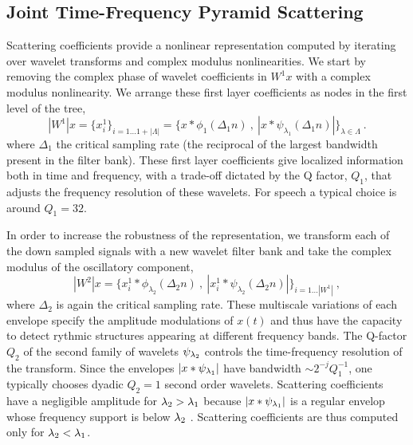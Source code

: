 \subsection{Joint Time-Frequency Pyramid Scattering}

Scattering coefficients provide a nonlinear representation 
computed by iterating over wavelet transforms and complex modulus nonlinearities. 
%
We start by removing the complex phase of wavelet coefficients in $W^1x$ with a 
complex modulus nonlinearity. We arrange these first layer coefficients as nodes in the first level of the tree,
\[
|W^1| x = \{ x^1_i \}_{i=1\dots 1+|\Lambda|}= \{x \ast \phi_1(\Delta_1 n)~,~|x \ast \psi_{\lambda_1}(\Delta_1 n)|  \}_{\lambda \in \Lambda}~.
\]
where $\Delta_1$ the critical sampling rate (the reciprocal of the largest bandwidth present
in the filter bank).
These first layer coefficients give localized information both in
time and frequency, with a trade-off dictated by the Q factor, $Q_1$, that adjusts the frequency resolution of 
these wavelets.  For speech a typical choice is around $Q_1=32$.

In order to increase the robustness of the representation, we transform each of the down sampled signals 
with a new wavelet filter bank and take the complex modulus of the oscillatory component, 
$$|W^2| x = \{ x^1_i \ast \phi_{\lambda_2}  (\Delta_2 n)~,~| x^1_i \ast \psi_{\lambda_2} (\Delta_2 n)| \}_{i=1\dots |W^1|}~,$$
where $\Delta_2$ is again the critical sampling rate. These multiscale variations of each envelope specify the amplitude modulations of $x(t)$ \cite{deepscatt} and 
thus have the capacity to detect rythmic structures appearing at different 
frequency bands. 
The Q-factor $Q_2$ of the second family of wavelets $\psi_{{\lambda}_2}$ 
controls the time-frequency resolution of the transform. 
Since the envelopes $| x \ast \psi_{{\lambda}_1}|$ have bandwidth $\sim 2^{-j} Q_1^{-1}$, 
one typically chooses dyadic $Q_2=1$ second order wavelets.
Scattering coefficients have a negligible amplitude for
${\lambda}_2 > {\lambda}_1$ because $|x \ast \psi_{{\lambda}_1}|$ is a regular envelop
whose frequency support is below ${\lambda}_2$ \cite{pami}. 
Scattering coefficients are thus computed only for ${\lambda}_2 < {\lambda}_1$. 

